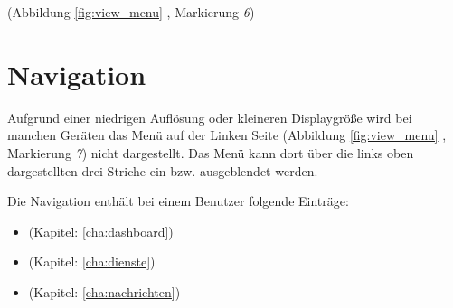 \noindent (Abbildung \ref{fig:view_menu} \textit{}, Markierung \textit{6})

\section{Navigation}
\label{sec:menu_navigation}
Aufgrund einer niedrigen Auflösung oder kleineren Displaygröße wird bei manchen Geräten das Menü auf der Linken Seite \noindent (Abbildung \ref{fig:view_menu} \textit{}, Markierung \textit{7}) nicht dargestellt. Das Menü kann dort über die links oben dargestellten drei Striche ein bzw. ausgeblendet werden.

\noindent Die Navigation enthält bei einem Benutzer folgende Einträge: 
\begin{itemize}
\item {} (Kapitel: \ref{cha:dashboard})
\item {} (Kapitel: \ref{cha:dienste})
\item {} (Kapitel: \ref{cha:nachrichten})
\end{itemize}